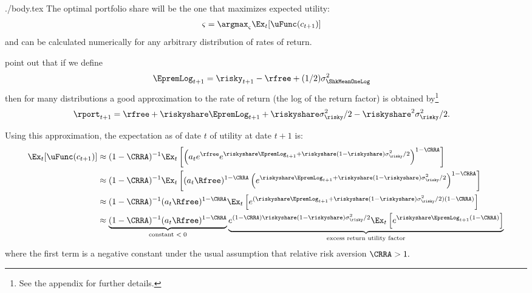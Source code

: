\documentclass{handout}
\begin{document}
\begin{verbatimwrite}{./body.tex}
The optimal portfolio share will be the one that maximizes expected utility:
\begin{equation}\begin{gathered}\begin{aligned}
  \varsigma & =  \argmax_{\varsigma} \Ex_{t}[\uFunc(c_{t+1})]
\end{aligned}\end{gathered}\end{equation}
and can be calculated numerically for any arbitrary distribution of rates of return.

\cite{cvAppendix} point out that if we define
\begin{equation}\begin{gathered}\begin{aligned}
  \EpremLog_{t+1} & =  \risky_{t+1}-\rfree + (1/2)\sigma^{2}_{\ShkMeanOneLog} \label{eq:eprem}
\end{aligned}\end{gathered}\end{equation}
then for many distributions a good approximation to the rate of return (the log of the return factor) is obtained by\footnote{See the appendix for further details.}
\begin{equation}\begin{gathered}\begin{aligned}
  \rport_{t+1} & =  \rfree+ \riskyshare \EpremLog_{t+1}+\riskyshare \sigma^{2}_{\risky}/2 - \riskyshare^{2}\sigma^{2}_{\risky}/2 \label{eq:rportCV}.
\end{aligned}\end{gathered}\end{equation}

Using this approximation, the expectation as of date $t$ of utility at date $t+1$ is:
\begin{equation}\label{eq:exputil}\begin{split}
  \Ex_{t}[\uFunc(c_{t+1})] & \approx  (1-\CRRA)^{-1}\Ex_{t}\left[\left(a_{t}e^{\rfree}e^{\riskyshare \EpremLog_{t+1}+\riskyshare(1-\riskyshare)\sigma^{2}_{\risky}/2 }\right)^{1-\CRRA}\right] 
\\                      & \approx  (1-\CRRA)^{-1}\Ex_{t}\left[(a_{t}\Rfree)^{1-\CRRA}\left( e^{\riskyshare \EpremLog_{t+1}+\riskyshare(1-\riskyshare)\sigma^{2}_{\risky}/2 }\right)^{1-\CRRA}\right] 
\\                      & \approx  (1-\CRRA)^{-1}(a_{t}\Rfree)^{1-\CRRA}\Ex_{t}\left[e^{(\riskyshare \EpremLog_{t+1}+\riskyshare(1-\riskyshare)\sigma^{2}_{\risky}/2)  (1-\CRRA)}\right] 
\\                      & \approx  \underbrace{(1-\CRRA)^{-1}(a_{t}\Rfree)^{1-\CRRA}}_{\text{constant $< 0$}}\underbrace{e^{ (1-\CRRA)\riskyshare(1-\riskyshare)\sigma^{2}_{\risky}/2}\Ex_{t}\left[e^{\riskyshare \EpremLog_{t+1}  (1-\CRRA)}\right]}_{\text{excess return utility factor}}
 \end{split}
  \end{equation}
where the first term is a negative constant under the usual assumption that relative risk aversion $\CRRA>1.$


\end{verbatimwrite}
\end{document}
